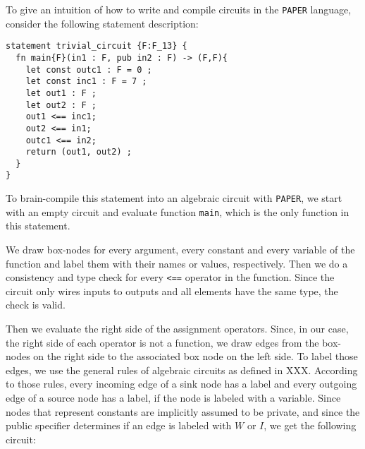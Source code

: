 \begin{example} To give an intuition of how to write and compile circuits in the \texttt{PAPER} language, consider the following statement description:
\begin{lstlisting}
statement trivial_circuit {F:F_13} {
  fn main{F}(in1 : F, pub in2 : F) -> (F,F){
    let const outc1 : F = 0 ;   
    let const inc1 : F = 7 ;
    let out1 : F ;
    let out2 : F ;
    out1 <== inc1;
    out2 <== in1;
    outc1 <== in2;
    return (out1, out2) ;
  }
}
\end{lstlisting} 
To brain-compile this statement into an algebraic circuit with \texttt{PAPER}, we start with an empty circuit and evaluate function \texttt{main}, which is the only function in this statement. 

We draw box-nodes for every argument, every constant and every variable of the function and label them with their names or values, respectively.  Then we do a consistency and type check for every \texttt{<==} operator in the function. Since the circuit only wires inputs to outputs and all elements have the same type, the check is valid.

Then we evaluate the right side of the assignment operators. Since, in our case, the right side of each operator is not a function, we draw edges from the box-nodes on the right side to the associated box node on the left side. To label those edges, we use the general rules of algebraic circuits as defined in XXX. According to those rules, every incoming edge of a sink node has a label and every outgoing edge of a source node has a label, if the node is labeled with a variable. Since nodes that represent constants are implicitly assumed to be private, and since the public specifier determines if an edge is labeled with $W$ or $I$, we get the following circuit:
\begin{center}
\end{center}
\end{example}
